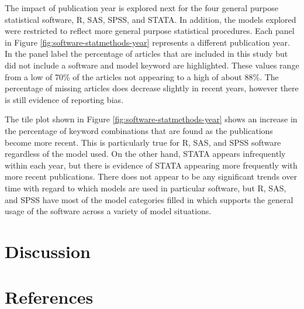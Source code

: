 \documentclass[english,,man]{apa6}
\theoremstyle{definition}
\theoremstyle{definition}
\theoremstyle{definition}
\theoremstyle{remark}
\begin{document}
The impact of publication year is explored next for the four general
purpose statistical software, R, SAS, SPSS, and STATA. In addition, the
models explored were restricted to reflect more general purpose
statistical procedures. Each panel in Figure
\ref{fig:software-statmethods-year} represents a different publication
year. In the panel label the percentage of articles that are included in
this study but did not include a software and model keyword are
highlighted. These values range from a low of 70\% of the articles not
appearing to a high of about 88\%. The percentage of missing articles
does decrease slightly in recent years, however there is still evidence
of reporting bias.

The tile plot shown in Figure \ref{fig:software-statmethods-year} shows
an increase in the percentage of keyword combinations that are found as
the publications become more recent. This is particularly true for R,
SAS, and SPSS software regardless of the model used. On the other hand,
STATA appears infrequently within each year, but there is evidence of
STATA appearing more frequently with more recent publications. There
does not appear to be any significant trends over time with regard to
which models are used in particular software, but R, SAS, and SPSS have
most of the model categories filled in which supports the general usage
of the software across a variety of model situations.

\hypertarget{discussion}{%
\section{Discussion}\label{discussion}}

\hypertarget{references}{%
\section{References}\label{references}}

\setlength{\parindent}{-0.5in}
\setlength{\leftskip}{0.5in}
\end{document}
